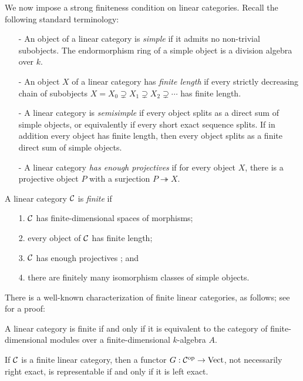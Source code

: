 \documentclass{amsart}
\begin{document}
We now impose a strong finiteness condition on linear categories.  Recall the following standard terminology:
\begin{itemize}
	\item[-] An object of a linear category is {\em simple} if it admits no non-trivial subobjects. The endormorphism ring of a simple object is a division algebra over $k$. %
	\item[-] An object $X$ of a linear category has {\em finite length} if every strictly decreasing chain of subobjects $X = X_0 \supsetneq X_1 \supsetneq X_2 \supsetneq  \cdots$ has finite length. 
	\item[-] A linear category is {\em semisimple} if every object splits as a direct sum of simple objects, or equivalently if every short exact sequence splits. If in addition every object has finite length, then every object splits as a finite direct sum of simple objects. %
	\item[-] A linear category {\em has enough projectives} if for every object $X$, there is a projective object $P$ with a surjection $P \twoheadrightarrow X$. 
\end{itemize}


\begin{definition} %
	A linear category $\mathcal C$ is {\em finite} if 
	\begin{enumerate}
		\item[1.] $\mathcal C$ has finite-dimensional spaces of morphisms;
		\item[2.] every object of $\mathcal C$ has finite length;
		\item[3.] $\mathcal C$ has enough projectives%
		; and
		\item[4.] there are finitely many isomorphism classes of simple objects.  
	\end{enumerate}
\end{definition}

There is a well-known characterization of finite linear categories, as follows; see~\cite{BTP} for a proof:
\begin{proposition} \label{prop:catismod}
A linear category is finite if and only if it is equivalent to the category of finite-dimensional modules over a finite-dimensional $k$-algebra $A$.
\end{proposition}

\begin{lemma} \label{lma:left_exact=linear}
	If $\mathcal C$ is a finite linear category, then a  functor $G: \mathcal C^{\mathrm{op}} \to \mathrm{Vect}$, not necessarily right exact, is representable if and only if it is left exact. 
\end{lemma}
\end{document}
